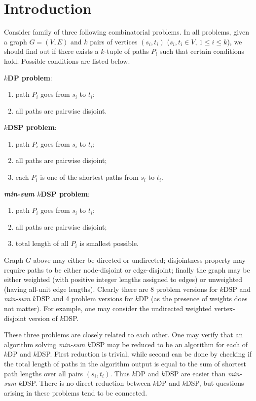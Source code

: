 \section{Introduction}

Consider family of three following combinatorial problems. In all problems, given a graph $G = (V, E)$ and $k$ pairs of vertices $(s_i, t_i)$ ($s_i, t_i \in V$, $1 \leq i \leq k$), we should find out if there exists a $k$-tuple of paths $P_i$ such that certain conditions hold. Possible conditions are listed below.

\textbf{$k$DP problem}:
\begin{enumerate}[leftmargin=1.5cm,topsep=0cm]
    \item path $P_i$ goes from $s_i$ to $t_i$;
    \item all paths are pairwise disjoint.
\end{enumerate}

\textbf{$k$DSP problem}: 
\begin{enumerate}[leftmargin=1.5cm,topsep=0cm]
    \item path $P_i$ goes from $s_i$ to $t_i$;
    \item all paths are pairwise disjoint;
    \item each $P_i$ is one of the shortest paths from $s_i$ to $t_i$.
\end{enumerate}

\textbf{\textit{min-sum} $k$DSP problem}: 
\begin{enumerate}[leftmargin=1.5cm,topsep=0cm] 
    \item path $P_i$ goes from $s_i$ to $t_i$;
    \item all paths are pairwise disjoint;
    \item total length of all $P_i$ is smallest possible.
\end{enumerate}

Graph $G$ above may either be directed or undirected; disjointness property may require paths to be either node-disjoint or edge-disjoint; finally the graph may be either weighted (with positive integer lengths assigned to edges) or unweighted (having all-unit edge lengths). Clearly there are 8 problem versions for $k$DSP and \textit{min-sum} $k$DSP and 4 problem versions for $k$DP (as the presence of weights does not matter). For example, one may consider the undirected weighted vertex-disjoint version of $k$DSP.

These three problems are closely related to each other. One may verify that an algorithm solving \textit{min-sum} $k$DSP may be reduced to be an algorithm for each of $k$DP and $k$DSP. First reduction is trivial, while second can be done by checking if the total length of paths in the algorithm output is equal to the sum of shortest path lengths over all pairs $(s_i, t_i)$. Thus $k$DP and $k$DSP are easier than \textit{min-sum} $k$DSP. There is no direct reduction between $k$DP and $k$DSP, but questions arising in these problems tend to be connected.


